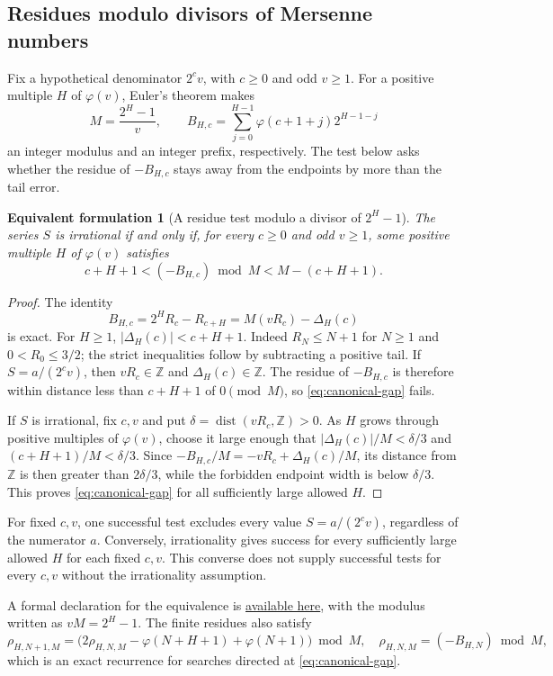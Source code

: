 \documentclass[11pt]{article}
\theoremstyle{plain}
\newtheorem{equivform}[thm]{Equivalent formulation}
\theoremstyle{definition}
\theoremstyle{remark}
\newcommand{\Z}{\mathbb{Z}}
\newcommand{\ph}{\varphi}
\begin{document}
\subsection{Residues modulo divisors of Mersenne numbers}\label{long249:r3-mersenne}
Fix a hypothetical denominator $2^cv$, with $c\ge0$ and odd $v\ge1$.
For a positive multiple $H$ of $\varphi(v)$, Euler's theorem makes
\[
 M=\frac{2^H-1}{v},\qquad
 B_{H,c}=\sum_{j=0}^{H-1}\varphi(c+1+j)2^{H-1-j}
\]
an integer modulus and an integer prefix, respectively. The test below
asks whether the residue of $-B_{H,c}$ stays away from the endpoints
by more than the tail error.

\begin{equivform}[A residue test modulo a divisor of $2^H-1$]\label{res:canonicalmersenne}
The series $S$ is irrational if and only if, for every $c\ge0$ and odd
$v\ge1$, some positive multiple $H$ of $\ph(v)$ satisfies
\begin{equation}\label{eq:canonical-gap}
 c+H+1<(-B_{H,c})\bmod M<M-(c+H+1).
\end{equation}
\end{equivform}
\begin{proof}
The identity
\[
 B_{H,c}=2^HR_c-R_{c+H}=M(vR_c)-\Delta_H(c)
\]
is exact. For $H\ge1$, $|\Delta_H(c)|<c+H+1$. Indeed $R_N\le N+1$
for $N\ge1$ and $0<R_0\le3/2$; the strict inequalities follow by subtracting
a positive tail. If $S=a/(2^cv)$, then $vR_c\in\Z$ and
$\Delta_H(c)\in\Z$. The residue of $-B_{H,c}$ is therefore within distance
less than $c+H+1$ of $0\pmod M$, so \eqref{eq:canonical-gap} fails.

If $S$ is irrational, fix $c,v$ and put
$\delta=\operatorname{dist}(vR_c,\Z)>0$. As $H$ grows through positive
multiples of $\ph(v)$, choose it large enough that
$|\Delta_H(c)|/M<\delta/3$ and $(c+H+1)/M<\delta/3$.
Since $-B_{H,c}/M=-vR_c+\Delta_H(c)/M$, its distance from $\Z$
is then greater than $2\delta/3$, while the forbidden endpoint
width is below $\delta/3$. This proves \eqref{eq:canonical-gap}
for all sufficiently large allowed $H$.
\end{proof}
For fixed $c,v$, one successful test excludes every value
$S=a/(2^cv)$, regardless of the numerator $a$. Conversely,
irrationality gives success for every sufficiently large allowed $H$
for each fixed $c,v$. This converse does not supply successful tests
for every $c,v$ without the irrationality assumption.

A formal declaration for the equivalence is
\href{https://github.com/wcook04/plectis-erdos/blob/c91562bd574a387cde904481e609c7b4cacebb14/lean/ErdosProblems/Erdos249/CyclotomicAnchoredKill.lean\#L3165}{available here},
with the modulus written as $vM=2^H-1$.
The finite residues also satisfy
\[
 \rho_{H,N+1,M}=
 \bigl(2\rho_{H,N,M}-\ph(N+H+1)+\ph(N+1)\bigr)\bmod M,
 \quad \rho_{H,N,M}=(-B_{H,N})\bmod M,
\]
which is an exact recurrence for searches directed at \eqref{eq:canonical-gap}.
\end{document}
